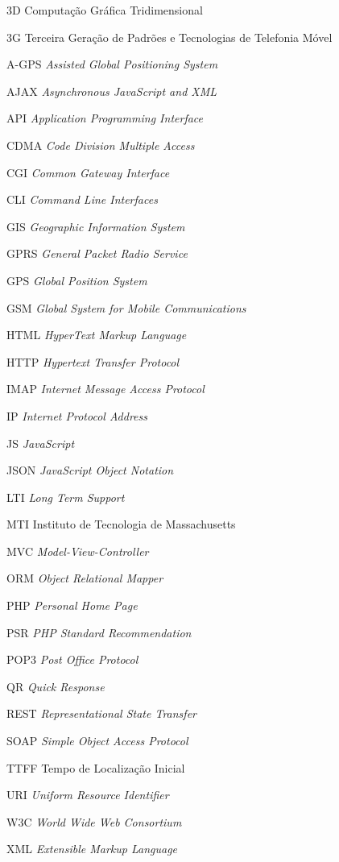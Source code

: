 
\begin{siglas}
    \item[3D] Computação Gráfica Tridimensional
    \item[3G] Terceira Geração de Padrões e Tecnologias de Telefonia Móvel
    \item[A-GPS] \textit{Assisted Global Positioning System}
    \item[AJAX] \textit{Asynchronous JavaScript and XML}
    \item[API] \textit{Application Programming Interface}
    \item[CDMA] \textit{Code Division Multiple Access}
    \item[CGI] \textit{Common Gateway Interface}
    \item[CLI] \textit{Command Line Interfaces}
    \item[GIS] \textit{Geographic Information System}
    \item[GPRS] \textit{General Packet Radio Service}
    \item[GPS] \textit{Global Position System}
    \item[GSM] \textit{Global System for Mobile Communications}
    \item[HTML] \textit{HyperText Markup Language}
    \item[HTTP] \textit{Hypertext Transfer Protocol}
    \item[IMAP] \textit{Internet Message Access Protocol}
    \item[IP] \textit{Internet Protocol Address}
    \item[JS] \textit{JavaScript}
    \item[JSON] \textit{JavaScript Object Notation}
    \item[LTI] \textit{Long Term Support}
    \item[MTI] Instituto de Tecnologia de Massachusetts
    \item[MVC] \textit{Model-View-Controller}
    \item[ORM] \textit{Object Relational Mapper}
    \item[PHP] \textit{Personal Home Page}
    \item[PSR] \textit{PHP Standard Recommendation}
    \item[POP3] \textit{Post Office Protocol}
    \item[QR] \textit{Quick Response}
    \item[REST] \textit{Representational State Transfer}
    \item[SOAP] \textit{Simple Object Access Protocol}
    \item[TTFF] Tempo de Localização Inicial
    \item[URI] \textit{Uniform Resource Identifier}
    \item[W3C] \textit{World Wide Web Consortium}
    \item[XML] \textit{Extensible Markup Language}
\end{siglas}

